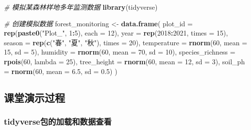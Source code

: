 \documentclass[
]{book}
\newenvironment{Shaded}{\begin{snugshade}}{\end{snugshade}}
\newcommand{\AttributeTok}[1]{\textcolor[rgb]{0.13,0.29,0.53}{#1}}
\newcommand{\CommentTok}[1]{\textcolor[rgb]{0.56,0.35,0.01}{\textit{#1}}}
\newcommand{\DecValTok}[1]{\textcolor[rgb]{0.00,0.00,0.81}{#1}}
\newcommand{\FloatTok}[1]{\textcolor[rgb]{0.00,0.00,0.81}{#1}}
\newcommand{\FunctionTok}[1]{\textcolor[rgb]{0.13,0.29,0.53}{\textbf{#1}}}
\newcommand{\NormalTok}[1]{#1}
\newcommand{\OtherTok}[1]{\textcolor[rgb]{0.56,0.35,0.01}{#1}}
\newcommand{\SpecialCharTok}[1]{\textcolor[rgb]{0.81,0.36,0.00}{\textbf{#1}}}
\newcommand{\StringTok}[1]{\textcolor[rgb]{0.31,0.60,0.02}{#1}}
\begin{document}
\begin{Shaded}
\begin{Highlighting}[]
\CommentTok{\# 模拟某森林样地多年监测数据}
\FunctionTok{library}\NormalTok{(tidyverse)}

\CommentTok{\# 创建模拟数据}
\NormalTok{forest\_monitoring }\OtherTok{\textless{}{-}} \FunctionTok{data.frame}\NormalTok{(}
  \AttributeTok{plot\_id =} \FunctionTok{rep}\NormalTok{(}\FunctionTok{paste0}\NormalTok{(}\StringTok{"Plot\_"}\NormalTok{, }\DecValTok{1}\SpecialCharTok{:}\DecValTok{5}\NormalTok{), }\AttributeTok{each =} \DecValTok{12}\NormalTok{),}
  \AttributeTok{year =} \FunctionTok{rep}\NormalTok{(}\DecValTok{2018}\SpecialCharTok{:}\DecValTok{2021}\NormalTok{, }\AttributeTok{times =} \DecValTok{15}\NormalTok{),}
  \AttributeTok{season =} \FunctionTok{rep}\NormalTok{(}\FunctionTok{c}\NormalTok{(}\StringTok{"春"}\NormalTok{, }\StringTok{"夏"}\NormalTok{, }\StringTok{"秋"}\NormalTok{), }\AttributeTok{times =} \DecValTok{20}\NormalTok{),}
  \AttributeTok{temperature =} \FunctionTok{rnorm}\NormalTok{(}\DecValTok{60}\NormalTok{, }\AttributeTok{mean =} \DecValTok{15}\NormalTok{, }\AttributeTok{sd =} \DecValTok{5}\NormalTok{),}
  \AttributeTok{humidity =} \FunctionTok{rnorm}\NormalTok{(}\DecValTok{60}\NormalTok{, }\AttributeTok{mean =} \DecValTok{70}\NormalTok{, }\AttributeTok{sd =} \DecValTok{10}\NormalTok{),}
  \AttributeTok{species\_richness =} \FunctionTok{rpois}\NormalTok{(}\DecValTok{60}\NormalTok{, }\AttributeTok{lambda =} \DecValTok{25}\NormalTok{),}
  \AttributeTok{tree\_height =} \FunctionTok{rnorm}\NormalTok{(}\DecValTok{60}\NormalTok{, }\AttributeTok{mean =} \DecValTok{12}\NormalTok{, }\AttributeTok{sd =} \DecValTok{3}\NormalTok{),}
  \AttributeTok{soil\_ph =} \FunctionTok{rnorm}\NormalTok{(}\DecValTok{60}\NormalTok{, }\AttributeTok{mean =} \FloatTok{6.5}\NormalTok{, }\AttributeTok{sd =} \FloatTok{0.5}\NormalTok{)}
\NormalTok{)}
\end{Highlighting}
\end{Shaded}

\hypertarget{ux8bfeux5802ux6f14ux793aux8fc7ux7a0b-8}{%
\subsection{课堂演示过程}\label{ux8bfeux5802ux6f14ux793aux8fc7ux7a0b-8}}

\hypertarget{tidyverseux5305ux7684ux52a0ux8f7dux548cux6570ux636eux67e5ux770b}{%
\subsubsection{tidyverse包的加载和数据查看}\label{tidyverseux5305ux7684ux52a0ux8f7dux548cux6570ux636eux67e5ux770b}}
\end{document}
